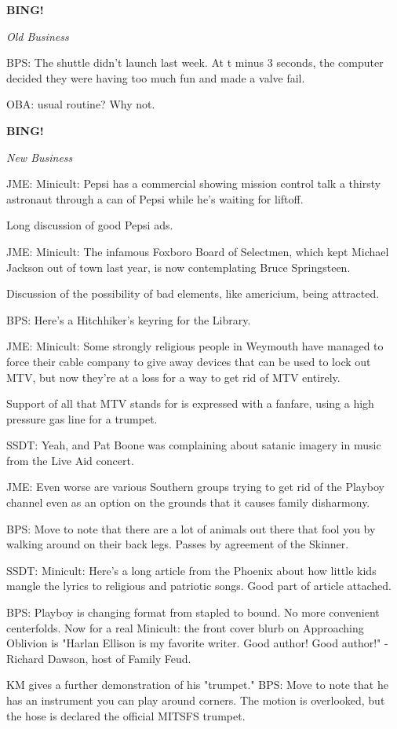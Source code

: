 \documentclass[12pt]{article}
\newcommand{\bing}{{\bf BING!} }
\newcommand{\goto}[1]{\bing \vskip 12pt \centerline{{\em{#1}}}}
\begin{document}
\goto{Old Business}

BPS: The shuttle didn't launch last week. At t minus 3 seconds, the computer decided they were having too much fun and made a valve fail.

OBA: usual routine? Why not.

\goto{New Business}

JME: Minicult: Pepsi has a commercial showing mission control talk a thirsty astronaut through a can of Pepsi while he's waiting for liftoff.

Long discussion of good Pepsi ads.

JME: Minicult: The infamous Foxboro Board of Selectmen, which kept Michael Jackson out of town last year, is now contemplating Bruce Springsteen.

Discussion of the possibility of bad elements, like americium, being attracted.

BPS: Here's a Hitchhiker's keyring for the Library.

JME: Minicult: Some strongly religious people in Weymouth have managed to force their cable company to give away devices that can be used to lock out MTV, but now they're at a loss for a way to get rid of MTV entirely.

Support of all that MTV stands for is expressed with a fanfare, using a high pressure gas line for a trumpet.

SSDT: Yeah, and Pat Boone was complaining about satanic imagery in music from the Live Aid concert.

JME: Even worse are various Southern groups trying to get rid of the Playboy channel even as an option on the grounds that it causes family disharmony.

BPS: Move to note that there are a lot of animals out there that fool you by walking around on their back legs. Passes by agreement of the Skinner.

SSDT: Minicult: Here's a long article from the Phoenix about how little kids mangle the lyrics to religious and patriotic songs. Good part of article attached.

BPS: Playboy is changing format from stapled to bound. No more convenient centerfolds. Now for a real Minicult: the front cover blurb on Approaching Oblivion is "Harlan Ellison is my favorite writer. Good author! Good author!" -Richard Dawson, host of Family Feud.

KM gives a further demonstration of his "trumpet." BPS: Move to note that he has an instrument you can play around corners. The motion is overlooked, but the hose is declared the official MITSFS trumpet.
\end{document}
